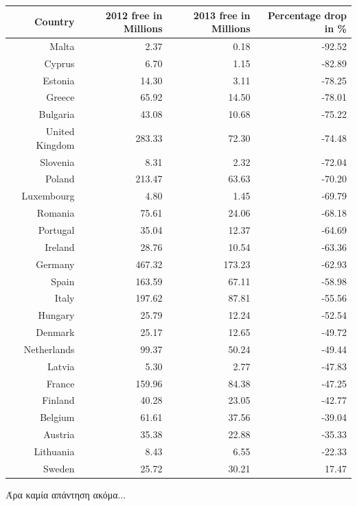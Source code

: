 \documentclass[a4paper,twoside,10pt]{article}
\begin{document}
\begin{table}[H]
	\centering
	\begin{tabular}{|r|rrr|}
		\hline
		Country & 2012 free in Millions & 2013 free in Millions & Percentage drop in \% \\
		\hline
		 Malta & 2.37 & 0.18 & -92.52 \\
		 Cyprus & 6.70 & 1.15 & -82.89 \\ 
		 Estonia & 14.30 & 3.11 & -78.25 \\
		 Greece & 65.92 & 14.50 & -78.01 \\
		 Bulgaria & 43.08 & 10.68 & -75.22 \\\hline
		United Kingdom & 283.33 & 72.30 & -74.48 \\
		 Slovenia & 8.31 & 2.32 & -72.04 \\ 
		  \rowcolor{cyan} Poland & 213.47 & 63.63 & -70.20 \\
		 Luxembourg & 4.80 & 1.45 & -69.79 \\
		Romania & 75.61 & 24.06 & -68.18 \\\hline
	Portugal & 35.04 & 12.37 & -64.69 \\ 
		 Ireland & 28.76 & 10.54 & -63.36 \\
		 Germany & 467.32 & 173.23 & -62.93 \\
		 Spain & 163.59 & 67.11 & -58.98 \\
		 Italy & 197.62 & 87.81 & -55.56 \\\hline
		Hungary & 25.79 & 12.24 & -52.54 \\ 
		Denmark & 25.17 & 12.65 & -49.72 \\
		Netherlands & 99.37 & 50.24 & -49.44 \\
		 Latvia & 5.30 & 2.77 & -47.83 \\
		 \rowcolor[rgb]{1,0.5,0.5} France & 159.96 & 84.38 & -47.25 \\\hline
		 Finland & 40.28 & 23.05 & -42.77 \\
		 Belgium & 61.61 & 37.56 & -39.04 \\
		Austria & 35.38 & 22.88 & -35.33 \\
		 Lithuania & 8.43 & 6.55 & -22.33 \\ 
		 Sweden & 25.72 & 30.21 & 17.47 \\
		\hline
		\end{tabular}
	\end{table}

Άρα καμία απάντηση ακόμα...
\end{document}
